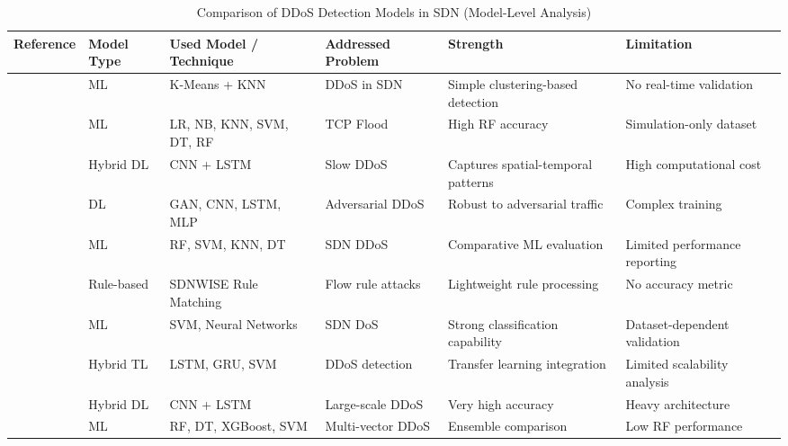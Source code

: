 \documentclass[ASNA,twocolumn]{USG} %
\begin{document}
\begin{table}[htb!]
\centering
\caption{Comparison of DDoS Detection Models in SDN (Model-Level Analysis)}
\label{tab:comparison1a}
\renewcommand{\arraystretch}{1.2}
\begin{tabular}{|p{1.5cm}|p{1.5cm}|p{3.2cm}|p{2.2cm}|p{2.9cm}|p{2.9cm}|}
\hline
\textbf{Reference} & \textbf{Model Type} & \textbf{Used Model / Technique} & \textbf{Addressed Problem} & \textbf{Strength} & \textbf{Limitation} \\
\hline

\cite{tan2020new} & ML & K-Means + KNN & DDoS in SDN & Simple clustering-based detection & No real-time validation \\
\hline

\cite{khashab2021ddos} & ML & LR, NB, KNN, SVM, DT, RF & TCP Flood & High RF accuracy & Simulation-only dataset \\
\hline

\cite{nugraha2020deep} & Hybrid DL & CNN + LSTM & Slow DDoS & Captures spatial-temporal patterns & High computational cost \\
\hline

\cite{novaes2021adversarial} & DL & GAN, CNN, LSTM, MLP & Adversarial DDoS & Robust to adversarial traffic & Complex training \\
\hline

\cite{nadeem2022ddos} & ML & RF, SVM, KNN, DT & SDN DDoS & Comparative ML evaluation & Limited performance reporting \\
\hline

\cite{bhayo2021time} & Rule-based & SDNWISE Rule Matching & Flow rule attacks & Lightweight rule processing & No accuracy metric \\
\hline

\cite{gadze2021investigation} & ML & SVM, Neural Networks & SDN DoS & Strong classification capability & Dataset-dependent validation \\
\hline

\cite{polat2022novel} & Hybrid TL & LSTM, GRU, SVM & DDoS detection & Transfer learning integration & Limited scalability analysis \\
\hline

\cite{elubeyd2023hybrid} & Hybrid DL & CNN + LSTM & Large-scale DDoS & Very high accuracy & Heavy architecture \\
\hline

\cite{fan2021detection} & ML & RF, DT, XGBoost, SVM & Multi-vector DDoS & Ensemble comparison & Low RF performance \\
\hline


\end{tabular}
\end{table}
\end{document}
